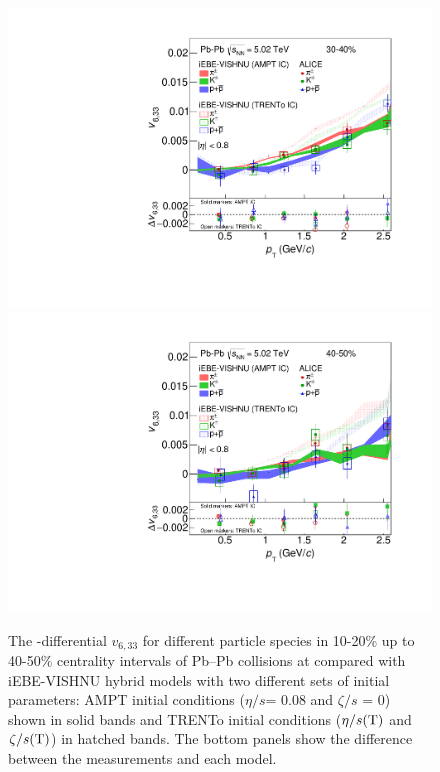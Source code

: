 \begin{figure}[!htb]
\begin{center}
\includegraphics[scale=0.26]{figures/model/TrentoAndAMPT_v633_gap00_new_30-40_PID2.pdf}
\includegraphics[scale=0.26]{figures/model/TrentoAndAMPT_v633_gap00_new_40-50_PID2.pdf}
\end{center}
\caption{The \pT-differential $v_{6,33}$ for different particle species in 10-20\% up to 40-50\% centrality intervals of Pb--Pb collisions at \sNN compared with iEBE-VISHNU hybrid models with two different sets of initial parameters: AMPT initial conditions ($\eta/s$= 0.08 and $\zeta/s$ = 0) shown in solid bands and TRENTo initial conditions ($\eta/s({\rm T})$ and $\zeta/s({\rm T})$) in hatched bands. The bottom panels show the difference between the measurements and each model.}
\label{v633_model}
\end{figure}


